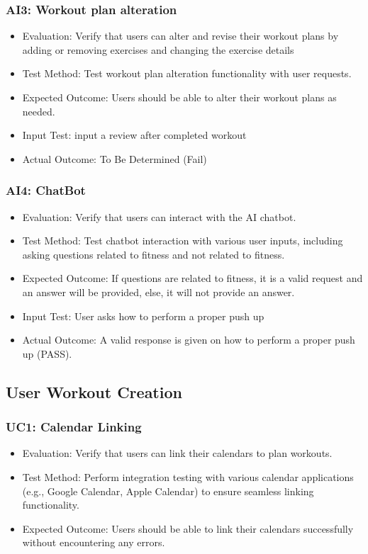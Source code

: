\documentclass[12pt, titlepage]{article}
\begin{document}
\subsubsection{AI3: Workout plan alteration}
\begin{itemize}
    \item Evaluation: Verify that users can alter and revise their workout plans by adding or removing exercises and changing the exercise details
    \item Test Method: Test workout plan alteration functionality with user requests.
    \item Expected Outcome: Users should be able to alter their workout plans as needed.
    \item Input Test: input a review after completed workout
    \item Actual Outcome: To Be Determined (Fail)
\end{itemize} 
\subsubsection{AI4: ChatBot}
\begin{itemize}
    \item Evaluation: Verify that users can interact with the AI chatbot.
    \item Test Method: Test chatbot interaction with various user inputs, including asking questions related to fitness and not related to fitness.
    \item Expected Outcome: If questions are related to fitness, it is a valid request and an answer will be provided, else, it will not provide an answer.
    \item Input Test: User asks how to perform a proper push up
    \item Actual Outcome: A valid response is given on how to perform a proper push up (PASS).
\end{itemize} 
\subsection{User Workout Creation}
\subsubsection{UC1: Calendar Linking}
\begin{itemize}
    \item Evaluation: Verify that users can link their calendars to plan workouts.
    \item Test Method: Perform integration testing with various calendar applications (e.g., Google Calendar, Apple Calendar) to ensure seamless linking functionality.
    \item Expected Outcome: Users should be able to link their calendars successfully without encountering any errors.
\end{itemize}
\end{document}
